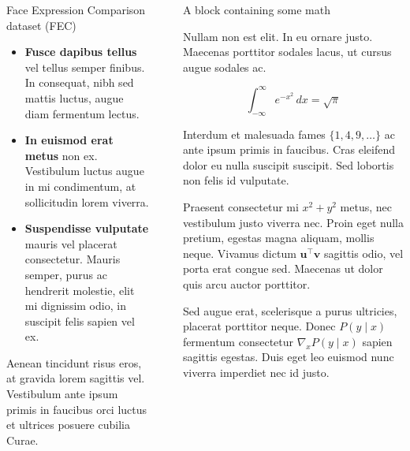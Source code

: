 \documentclass[final]{beamer}
\newlength{\sepwidth}
\newlength{\colwidth}
\newcommand{\separatorcolumn}{\begin{column}{\sepwidth}\end{column}}
\begin{document}
\begin{frame}[t]
\begin{columns}[t]
\begin{column}{\colwidth}
\begin{alertblock}{Face Expression Comparison dataset (FEC)}
    \begin{itemize}
      \item \textbf{Fusce dapibus tellus} vel tellus semper finibus. In
        consequat, nibh sed mattis luctus, augue diam fermentum lectus.
      \item \textbf{In euismod erat metus} non ex. Vestibulum luctus augue in
        mi condimentum, at sollicitudin lorem viverra.
      \item \textbf{Suspendisse vulputate} mauris vel placerat consectetur.
        Mauris semper, purus ac hendrerit molestie, elit mi dignissim odio, in
        suscipit felis sapien vel ex.
    \end{itemize}

    Aenean tincidunt risus eros, at gravida lorem sagittis vel. Vestibulum ante
    ipsum primis in faucibus orci luctus et ultrices posuere cubilia Curae.

  \end{alertblock}

\end{column}

\separatorcolumn

\begin{column}{\colwidth}

  \begin{block}{A block containing some math}

    Nullam non est elit. In eu ornare justo. Maecenas porttitor sodales lacus,
    ut cursus augue sodales ac.

    $$
    \int_{-\infty}^{\infty} e^{-x^2}\,dx = \sqrt{\pi}
    $$

    Interdum et malesuada fames $\{1, 4, 9, \ldots\}$ ac ante ipsum primis in
    faucibus. Cras eleifend dolor eu nulla suscipit suscipit. Sed lobortis non
    felis id vulputate.


    Praesent consectetur mi $x^2 + y^2$ metus, nec vestibulum justo viverra
    nec. Proin eget nulla pretium, egestas magna aliquam, mollis neque. Vivamus
    dictum $\mathbf{u}^\intercal\mathbf{v}$ sagittis odio, vel porta erat
    congue sed. Maecenas ut dolor quis arcu auctor porttitor.


    Sed augue erat, scelerisque a purus ultricies, placerat porttitor neque.
    Donec $P(y \mid x)$ fermentum consectetur $\nabla_x P(y \mid x)$ sapien
    sagittis egestas. Duis eget leo euismod nunc viverra imperdiet nec id
    justo.


\end{block}
\end{column}
\end{columns}
\end{frame}
\end{document}
